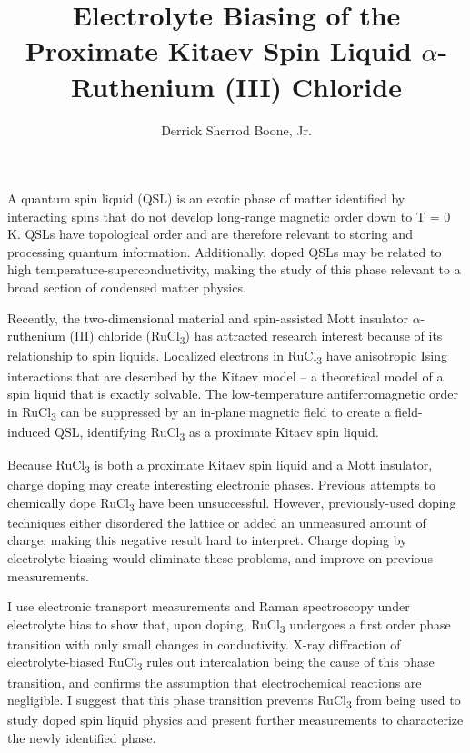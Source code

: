\documentclass[12pt]{report}
\title{Electrolyte Biasing of the Proximate Kitaev Spin Liquid $\alpha$-Ruthenium (III) Chloride}
\author{Derrick Sherrod Boone, Jr.}
\newcommand{\rucl}{RuCl\textsubscript{3} }
\newcommand{\ruclnospace}{RuCl\textsubscript{3}}
\begin{document}

    \beforepreface


A quantum spin liquid (QSL) is an exotic phase of matter identified by interacting spins that do not develop long-range magnetic order down to T = 0 K. QSLs have topological order and are therefore relevant to storing and processing quantum information. Additionally, doped QSLs may be related to high temperature-superconductivity, making the study of this phase relevant to a broad section of condensed matter physics.

Recently, the two-dimensional material and spin-assisted Mott insulator $\alpha$-ruthenium (III) chloride (\ruclnospace) has attracted research interest because of its relationship to spin liquids. Localized electrons in \rucl have anisotropic Ising interactions that are described by the Kitaev model – a theoretical model of a spin liquid that is exactly solvable. The low-temperature antiferromagnetic order in \rucl can be suppressed by an in-plane magnetic field to create a field-induced QSL, identifying \rucl as a proximate Kitaev spin liquid.

Because \rucl is both a proximate Kitaev spin liquid and a Mott insulator, charge doping may create interesting electronic phases. Previous attempts to chemically dope \rucl have been unsuccessful. However, previously-used doping techniques either disordered the lattice or added an unmeasured amount of charge, making this negative result hard to interpret. Charge doping by electrolyte biasing would eliminate these problems, and improve on previous measurements.

I use electronic transport measurements and Raman spectroscopy under electrolyte bias to show that, upon doping, \rucl undergoes a first order phase transition with only small changes in conductivity. X-ray diffraction of electrolyte-biased \rucl rules out intercalation being the cause of this phase transition, and confirms the assumption that electrochemical reactions are negligible. I suggest that this phase transition prevents \rucl from being used to study doped spin liquid physics and present further measurements to characterize the newly identified phase.
\end{document}
